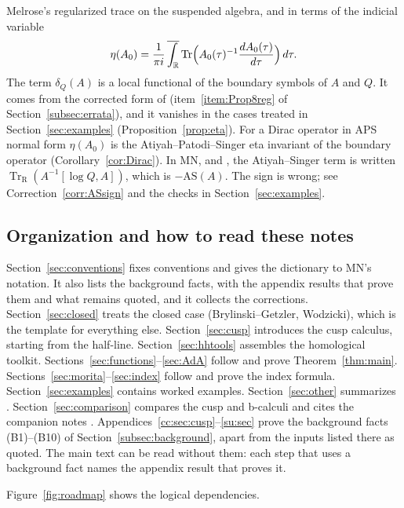 \documentclass[11pt,oneside,reqno]{article}
\DeclareMathOperator{\Tr}{Tr}
\newcommand{\R}{\mathbb R}
\newcommand{\TrR}{\Tr_{\mathrm R}}
\newcommand{\lQ}{\log Q}
\newcommand{\AS}{\mathrm{AS}}
\theoremstyle{plain}
\theoremstyle{definition}
\theoremstyle{remark}
\begin{document}
Melrose's regularized trace on the suspended algebra, and in terms of the
indicial variable
\[
 \eta(A_0)=\frac1{\pi i}\,\overline{\int_{\R}}\Tr\Bigl(A_0(\tau)^{-1}
 \frac{dA_0(\tau)}{d\tau}\Bigr)\,d\tau .
\]
The term \(\delta_Q(A)\) is a local functional of the boundary symbols of
\(A\) and \(Q\). It comes from the corrected form of \cite[Prop.~8]{MN}
(item~\ref{item:Prop8reg} of Section~\ref{subsec:errata}), and it vanishes
in the cases treated in Section~\ref{sec:examples}
(Proposition~\ref{prop:eta}). For a Dirac operator in APS normal form
\(\eta(A_0)\) is the Atiyah--Patodi--Singer
eta invariant of the boundary operator (Corollary~\ref{cor:Dirac}). In MN,
\cite[(22)--(24)]{MN} and \cite[(100)]{MN}, the Atiyah--Singer term is
written \(\TrR(A^{-1}[\lQ,A])\), which is \(-\AS(A)\). The sign is wrong;
see Correction~\ref{corr:ASsign} and the checks in
Section~\ref{sec:examples}.

\subsection{Organization and how to read these notes}
Section~\ref{sec:conventions} fixes conventions and gives the dictionary to
MN's notation. It also lists the background facts, with the appendix
results that prove them and what remains quoted, and it collects the
corrections. Section~\ref{sec:closed} treats the closed case
(Brylinski--Getzler, Wodzicki), which is the template for everything else.
Section~\ref{sec:cusp} introduces the cusp calculus, starting from the
half-line. Section~\ref{sec:hhtools} assembles the homological toolkit.
Sections~\ref{sec:functions}--\ref{sec:AdA} follow \cite[\S\S1--8]{MN} and
prove Theorem~\ref{thm:main}. Sections~\ref{sec:morita}--\ref{sec:index}
follow \cite[\S\S9--12]{MN} and prove the index formula.
Section~\ref{sec:examples} contains worked examples.
Section~\ref{sec:other} summarizes \cite[\S\S13--15]{MN}.
Section~\ref{sec:comparison} compares the cusp and b-calculi and cites the
companion notes \cite{HHb}. Appendices~\ref{cc:sec:cusp}--\ref{su:sec}
prove the background facts (B1)--(B10) of Section~\ref{subsec:background},
apart from the inputs listed there as quoted. The main text can be read
without them: each step that uses a background fact names the appendix
result that proves it.

Figure~\ref{fig:roadmap} shows the logical dependencies.
\end{document}
